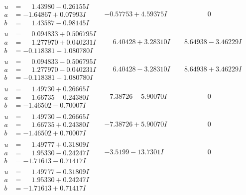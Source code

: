 \documentclass[1p]{elsarticle_modified}
\theoremstyle{definition}
\begin{document}
$$\begin{array}{c|c|c}
\begin{aligned}
u &= \phantom{-}1.43980 - 0.26155 I \\
a &= -1.64867 + 0.07993 I \\
b &= \phantom{-}1.43587 - 0.98145 I\end{aligned}
 & -0.57753 + 4.59375 I & \phantom{-0.000000 } 0 \\ \hline\begin{aligned}
u &= \phantom{-}0.094833 + 0.506795 I \\
a &= \phantom{-}1.277970 + 0.040231 I \\
b &= -0.118381 - 1.080780 I\end{aligned}
 & \phantom{-}6.40428 + 3.28310 I & \phantom{-}8.64938 - 3.46229 I \\ \hline\begin{aligned}
u &= \phantom{-}0.094833 - 0.506795 I \\
a &= \phantom{-}1.277970 - 0.040231 I \\
b &= -0.118381 + 1.080780 I\end{aligned}
 & \phantom{-}6.40428 - 3.28310 I & \phantom{-}8.64938 + 3.46229 I \\ \hline\begin{aligned}
u &= \phantom{-}1.49730 + 0.26665 I \\
a &= \phantom{-}1.66735 - 0.24380 I \\
b &= -1.46502 - 0.70007 I\end{aligned}
 & -7.38726 - 5.90070 I & \phantom{-0.000000 } 0 \\ \hline\begin{aligned}
u &= \phantom{-}1.49730 - 0.26665 I \\
a &= \phantom{-}1.66735 + 0.24380 I \\
b &= -1.46502 + 0.70007 I\end{aligned}
 & -7.38726 + 5.90070 I & \phantom{-0.000000 } 0 \\ \hline\begin{aligned}
u &= \phantom{-}1.49777 + 0.31809 I \\
a &= \phantom{-}1.95330 - 0.24247 I \\
b &= -1.71613 - 0.71417 I\end{aligned}
 & -3.5199 - 13.7301 I & \phantom{-0.000000 } 0 \\ \hline\begin{aligned}
u &= \phantom{-}1.49777 - 0.31809 I \\
a &= \phantom{-}1.95330 + 0.24247 I \\
b &= -1.71613 + 0.71417 I\end{aligned}

\end{array}$$
\end{document}
